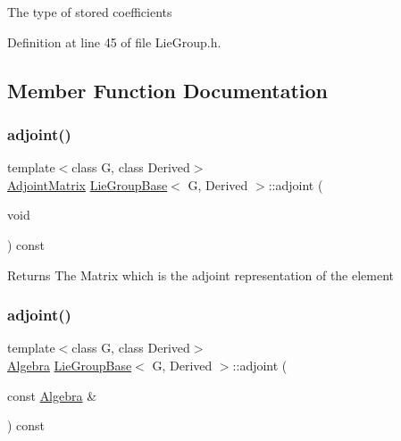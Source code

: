 The type of stored coefficients 

Definition at line 45 of file Lie\+Group.\+h.



\subsection{Member Function Documentation}
\hypertarget{class_lie_group_base_ad9cc69d31a563a4270be482d41382e4a}{}\label{class_lie_group_base_ad9cc69d31a563a4270be482d41382e4a} 
\subsubsection{\texorpdfstring{adjoint()}{adjoint()}\hspace{0.1cm}{\footnotesize\ttfamily [1/2]}}
{\footnotesize\ttfamily template$<$class G, class Derived$>$ \\
\hyperlink{class_lie_group_base_ab310fae7cfc1fe04e9d286403f2d4211}{Adjoint\+Matrix} \hyperlink{class_lie_group_base}{Lie\+Group\+Base}$<$ G, Derived $>$\+::adjoint (\begin{DoxyParamCaption}\item[{void}]{ }\end{DoxyParamCaption}) const}

\begin{DoxyReturn}{Returns}
The Matrix which is the adjoint representation of the element 
\end{DoxyReturn}
\hypertarget{class_lie_group_base_a348b65aebd4a92d88cafc9e23482bd26}{}\label{class_lie_group_base_a348b65aebd4a92d88cafc9e23482bd26} 
\subsubsection{\texorpdfstring{adjoint()}{adjoint()}\hspace{0.1cm}{\footnotesize\ttfamily [2/2]}}
{\footnotesize\ttfamily template$<$class G, class Derived$>$ \\
\hyperlink{class_lie_group_base_a3730354b1a76881717834e3dfd3187bd}{Algebra} \hyperlink{class_lie_group_base}{Lie\+Group\+Base}$<$ G, Derived $>$\+::adjoint (\begin{DoxyParamCaption}\item[{const \hyperlink{class_lie_group_base_a3730354b1a76881717834e3dfd3187bd}{Algebra} \&}]{ }\end{DoxyParamCaption}) const}

